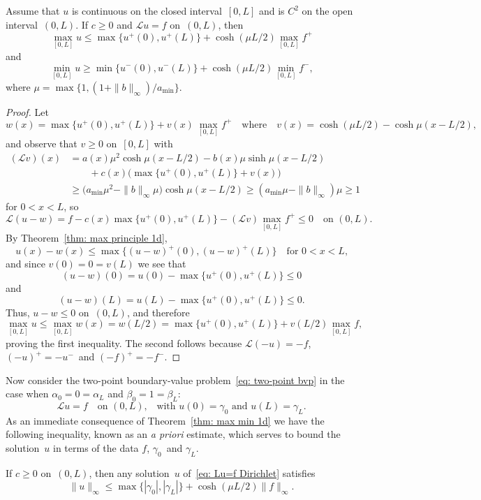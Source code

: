 \begin{theorem}\label{thm: max min 1d}
Assume that $u$ is continuous on the closed interval~$[0,L]$ and is $C^2$ on 
the open interval~$(0,L)$. If $c\ge0$ and $\mathcal{L}u=f$ on~$(0,L)$, then
\[
\max_{[0,L]}u\le\max\{u^+(0),u^+(L)\}+\cosh(\mu L/2)\max_{[0,L]}f^+
\]
and
\[
\min_{[0,L]}u\ge\min\{u^-(0),u^-(L)\}+\cosh(\mu L/2)\min_{[0,L]}f^-,
\]
where $\mu=\max\bigl\{1,(1+\|b\|_\infty)/a_{\min}\bigr\}$.
\end{theorem}
\begin{proof}
Let
\[
w(x)=\max\{u^+(0),u^+(L)\}+v(x)\,\max_{[0,L]}f^+
\quad\text{where}\quad
v(x)=\cosh(\mu L/2)-\cosh\mu(x-L/2),
\]
and observe that $v\ge0$ on~$[0,L]$ with
\begin{align*}
(\mathcal{L}v)(x)&=a(x)\mu^2\cosh\mu(x-L/2)
	-b(x)\mu\sinh\mu(x-L/2)\\
	&\qquad{}+c(x)\bigl(\max\{u^+(0),u^+(L)\}+v(x)\big)\\
	&\ge\bigl(a_{\min}\mu^2-\|b\|_\infty\mu\bigr)\cosh\mu(x-L/2)
	\ge(a_{\min}\mu-\|b\|_\infty)\mu\ge1
\end{align*}
for $0<x<L$, so
\[
\mathcal{L}(u-w)=f-c(x)\max\{u^+(0),u^+(L)\}-(\mathcal{L}v)\max_{[0,L]}f^+
	\le0\quad\text{on $(0,L)$.}
\]
By Theorem~\ref{thm: max principle 1d},
\[
u(x)-w(x)\le\max\{(u-w)^+(0),(u-w)^+(L)\}\quad\text{for $0<x<L$,}
\]
and since $v(0)=0=v(L)$ we see that 
\[
(u-w)(0)=u(0)-\max\{u^+(0),u^+(L)\}\le0
\]
and
\[
(u-w)(L)=u(L)-\max\{u^+(0),u^+(L)\}\le0.
\]
Thus, $u-w\le0$ on~$(0,L)$, and therefore 
\[
\max_{[0,L]}u\le\max_{[0,L]}w(x)=w(L/2)=\max\{u^+(0),u^+(L)\}
	+v(L/2)\max_{[0,L]}f, 
\]
proving the first inequality.  
The second follows because $\mathcal{L}(-u)=-f$, $(-u)^+=-u^-$~and
$(-f)^+=-f^-$.
\end{proof}

Now consider the two-point boundary-value problem~\eqref{eq: two-point bvp} in 
the case when $\alpha_0=0=\alpha_L$ and $\beta_0=1=\beta_L$:
\begin{equation}\label{eq: Lu=f Dirichlet}
\mathcal{L}u=f\quad\text{on $(0,L)$,}
	\quad\text{with $u(0)=\gamma_0$ and $u(L)=\gamma_L$.}
\end{equation}
As an immediate consequence of Theorem~\ref{thm: max min 1d} we have the 
following inequality, known as an \emph{a priori} estimate, which serves to 
bound the solution~$u$ in terms of the data $f$, $\gamma_0$~and $\gamma_L$.

\begin{theorem}\label{thm: Lu=f apriori infty}
If $c\ge0$ on~$(0,L)$, then any solution~$u$ of~\eqref{eq: Lu=f Dirichlet} 
satisfies
\[
\|u\|_\infty\le\max\{|\gamma_0|,|\gamma_L|\}+\cosh(\mu L/2)\|f\|_\infty.
\]
\end{theorem}

